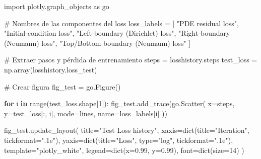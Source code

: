 \documentclass[
  spanish,
  us-letterpaper,
  DIV=11,
  numbers=noendperiod]{scrreprt}
\newenvironment{Shaded}{\begin{snugshade}}{\end{snugshade}}
\newcommand{\BuiltInTok}[1]{\textcolor[rgb]{0.00,0.23,0.31}{#1}}
\newcommand{\CommentTok}[1]{\textcolor[rgb]{0.37,0.37,0.37}{#1}}
\newcommand{\ControlFlowTok}[1]{\textcolor[rgb]{0.00,0.23,0.31}{\textbf{#1}}}
\newcommand{\DecValTok}[1]{\textcolor[rgb]{0.68,0.00,0.00}{#1}}
\newcommand{\FloatTok}[1]{\textcolor[rgb]{0.68,0.00,0.00}{#1}}
\newcommand{\ImportTok}[1]{\textcolor[rgb]{0.00,0.46,0.62}{#1}}
\newcommand{\KeywordTok}[1]{\textcolor[rgb]{0.00,0.23,0.31}{\textbf{#1}}}
\newcommand{\NormalTok}[1]{\textcolor[rgb]{0.00,0.23,0.31}{#1}}
\newcommand{\OperatorTok}[1]{\textcolor[rgb]{0.37,0.37,0.37}{#1}}
\newcommand{\StringTok}[1]{\textcolor[rgb]{0.13,0.47,0.30}{#1}}
\theoremstyle{definition}
\theoremstyle{plain}
\theoremstyle{remark}
\begin{document}
\begin{Shaded}
\begin{Highlighting}[]
\ImportTok{import}\NormalTok{ plotly.graph\_objects }\ImportTok{as}\NormalTok{ go}

\CommentTok{\# Nombres de las componentes del loss}
\NormalTok{loss\_labels }\OperatorTok{=}\NormalTok{ [}
    \StringTok{"PDE residual loss"}\NormalTok{,}
    \StringTok{"Initial‐condition loss"}\NormalTok{,}
    \StringTok{"Left‐boundary (Dirichlet) loss"}\NormalTok{,}
    \StringTok{"Right‐boundary (Neumann) loss"}\NormalTok{,}
    \StringTok{"Top/Bottom‐boundary (Neumann) loss"}
\NormalTok{]}

\CommentTok{\# Extraer pasos y pérdida de entrenamiento}
\NormalTok{steps }\OperatorTok{=}\NormalTok{ losshistory.steps}
\NormalTok{test\_loss }\OperatorTok{=}\NormalTok{ np.array(losshistory.loss\_test)}

\CommentTok{\# Crear figura}
\NormalTok{fig\_test }\OperatorTok{=}\NormalTok{ go.Figure()}

\ControlFlowTok{for}\NormalTok{ i }\KeywordTok{in} \BuiltInTok{range}\NormalTok{(test\_loss.shape[}\DecValTok{1}\NormalTok{]):}
\NormalTok{    fig\_test.add\_trace(go.Scatter(}
\NormalTok{        x}\OperatorTok{=}\NormalTok{steps,}
\NormalTok{        y}\OperatorTok{=}\NormalTok{test\_loss[:, i],}
\NormalTok{        mode}\OperatorTok{=}\StringTok{\textquotesingle{}lines\textquotesingle{}}\NormalTok{,}
\NormalTok{        name}\OperatorTok{=}\NormalTok{loss\_labels[i]}
\NormalTok{    ))}

\NormalTok{fig\_test.update\_layout(}
\NormalTok{    title}\OperatorTok{=}\StringTok{"Test Loss history"}\NormalTok{,}
\NormalTok{    xaxis}\OperatorTok{=}\BuiltInTok{dict}\NormalTok{(title}\OperatorTok{=}\StringTok{"Iteration"}\NormalTok{, tickformat}\OperatorTok{=}\StringTok{".1e"}\NormalTok{),}
\NormalTok{    yaxis}\OperatorTok{=}\BuiltInTok{dict}\NormalTok{(title}\OperatorTok{=}\StringTok{"Loss"}\NormalTok{, }\BuiltInTok{type}\OperatorTok{=}\StringTok{"log"}\NormalTok{, tickformat}\OperatorTok{=}\StringTok{".1e"}\NormalTok{),}
\NormalTok{    template}\OperatorTok{=}\StringTok{"plotly\_white"}\NormalTok{,}
\NormalTok{    legend}\OperatorTok{=}\BuiltInTok{dict}\NormalTok{(x}\OperatorTok{=}\FloatTok{0.99}\NormalTok{, y}\OperatorTok{=}\FloatTok{0.99}\NormalTok{),}
\NormalTok{    font}\OperatorTok{=}\BuiltInTok{dict}\NormalTok{(size}\OperatorTok{=}\DecValTok{14}\NormalTok{)}
\NormalTok{)}
\end{Highlighting}
\end{Shaded}
\end{document}
